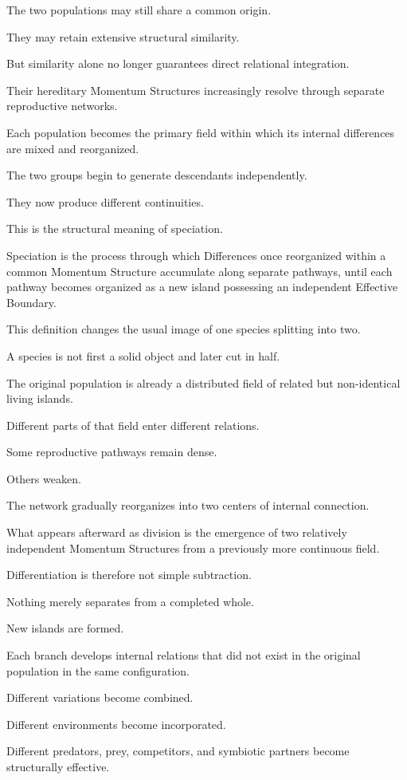 The two populations may still share a common origin.

They may retain extensive structural similarity.

But similarity alone no longer guarantees direct relational integration.

Their hereditary Momentum Structures increasingly resolve through separate reproductive networks.

Each population becomes the primary field within which its internal differences are mixed and reorganized.

The two groups begin to generate descendants independently.

They now produce different continuities.

This is the structural meaning of speciation.

Speciation is the process through which Differences once reorganized within a common Momentum Structure accumulate along separate pathways, until each pathway becomes organized as a new island possessing an independent Effective Boundary.

This definition changes the usual image of one species splitting into two.

A species is not first a solid object and later cut in half.

The original population is already a distributed field of related but non-identical living islands.

Different parts of that field enter different relations.

Some reproductive pathways remain dense.

Others weaken.

The network gradually reorganizes into two centers of internal connection.

What appears afterward as division is the emergence of two relatively independent Momentum Structures from a previously more continuous field.

Differentiation is therefore not simple subtraction.

Nothing merely separates from a completed whole.

New islands are formed.

Each branch develops internal relations that did not exist in the original population in the same configuration.

Different variations become combined.

Different environments become incorporated.

Different predators, prey, competitors, and symbiotic partners become structurally effective.

